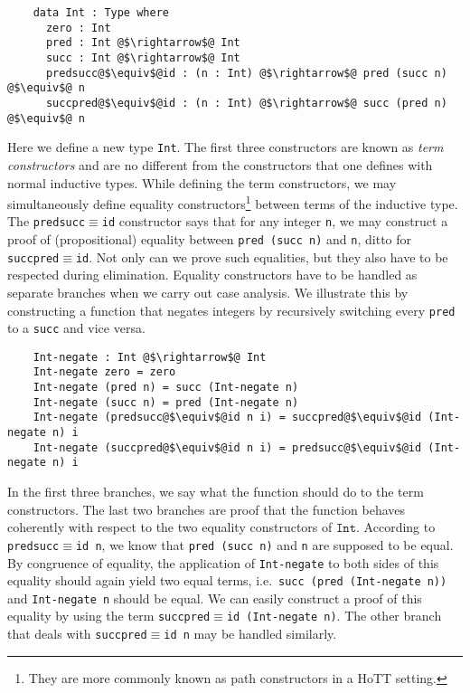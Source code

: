 \documentclass[12pt,twoside,maitrise]{dms}
\theoremstyle{definition}
\numberwithin{equation}{section}
\numberwithin{table}{chapter}
\numberwithin{figure}{chapter}
\newcommand\id[1] {\texttt{#1}}
\newcommand\fn[1] {\texttt{#1}}
\begin{document}
\begin{verbatim}
    data Int : Type where
      zero : Int
      pred : Int @$\rightarrow$@ Int
      succ : Int @$\rightarrow$@ Int
      predsucc@$\equiv$@id : (n : Int) @$\rightarrow$@ pred (succ n) @$\equiv$@ n
      succpred@$\equiv$@id : (n : Int) @$\rightarrow$@ succ (pred n) @$\equiv$@ n
\end{verbatim}

Here we define a new type \id{Int}. The first three constructors are known as
\emph{term constructors} and are no different from the constructors that one
defines with normal inductive types. While defining the term constructors, we
may simultaneously define equality constructors\footnote{They are more commonly
known as path constructors in a HoTT setting.} between terms of the inductive
type. The \id{predsucc$\equiv$id} constructor says that for any integer \id{n},
we may construct a proof of (propositional) equality between \fn{pred (succ n)}
and \id{n}, ditto for \id{succpred$\equiv$id}. Not only can we prove such
equalities, but they also have to be respected during elimination. Equality
constructors have to be handled as separate branches when we carry out case
analysis. We illustrate this by constructing a function that negates integers by
recursively switching every \id{pred} to a \id{succ} and vice versa.

\begin{verbatim}
    Int-negate : Int @$\rightarrow$@ Int
    Int-negate zero = zero
    Int-negate (pred n) = succ (Int-negate n)
    Int-negate (succ n) = pred (Int-negate n)
    Int-negate (predsucc@$\equiv$@id n i) = succpred@$\equiv$@id (Int-negate n) i
    Int-negate (succpred@$\equiv$@id n i) = predsucc@$\equiv$@id (Int-negate n) i
\end{verbatim}

In the first three branches, we say what the function should do to the term
constructors. The last two branches are proof that the function behaves
coherently with respect to the two equality constructors of $\id{Int}$.
According to \fn{predsucc$\equiv$id n}, we know that \fn{pred (succ n)} and
\fn{n} are supposed to be equal. By congruence of equality, the application of
\id{Int-negate} to both sides of this equality should again yield two equal
terms, i.e.\ \fn{succ (pred (Int-negate n))} and \fn{Int-negate n} should be
equal. We can easily construct a proof of this equality by using the term
\fn{succpred$\equiv$id (Int-negate n)}. The other branch that deals with
\fn{succpred$\equiv$id n} may be handled similarly.
\end{document}
